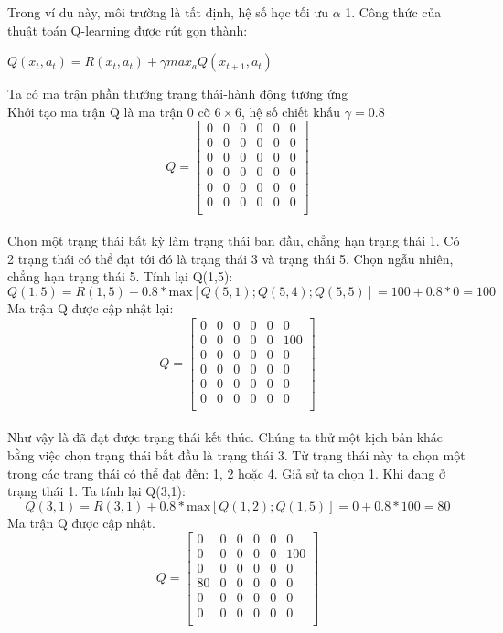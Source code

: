\documentclass[14pt,a4paper,oneside]{report}		%
\begin{document}
Trong ví dụ này, môi trường là tất định, hệ số học tối ưu $\alpha$ 1. Công thức của thuật toán Q-learning được rút gọn thành:
\begin{center}
$Q(x_t,a_t) = R(x_t,a_t)+\gamma max_aQ(x_{t+1},a_t)$\\
\end{center}
Ta có ma trận phần thưởng trạng thái-hành động tương ứng\\
Khởi tạo ma trận Q là ma trận 0 cỡ $6 \times 6$, hệ số chiết khấu $\gamma = 0.8$\\
$$Q=\begin{bmatrix}
0&0&0&0&0&0\\
0&0&0&0&0&0\\
0&0&0&0&0&0\\
0&0&0&0&0&0\\
0&0&0&0&0&0\\
0&0&0&0&0&0\\
\end{bmatrix}$$\\
Chọn một trạng thái bất kỳ làm trạng thái ban đầu, chẳng hạn  trạng thái 1. Có 2 trạng thái có thể đạt tới đó là trạng thái 3 và trạng thái 5. Chọn ngẫu nhiên, chẳng hạn trạng thái 5. Tính lại Q(1,5):
$$Q(1,5)=R(1,5)+0.8*\text{max}[{Q(5,1);Q(5,4);Q(5,5)}]=100+0.8*0=100$$
Ma trận Q được cập nhật lại:
$$Q=\begin{bmatrix}
0&0&0&0&0&0\\
0&0&0&0&0&100\\
0&0&0&0&0&0\\
0&0&0&0&0&0\\
0&0&0&0&0&0\\
0&0&0&0&0&0\\
\end{bmatrix}$$\\
Như vậy là đã đạt được trạng thái kết thúc. Chúng ta thử một  kịch bản khác bằng việc chọn trạng thái bắt đầu là trạng thái 3. Từ trạng thái này ta chọn một trong các trang thái có thể đạt đến: 1, 2 hoặc 4. Giả sử ta chọn 1. Khi đang ở trạng thái 1. Ta tính lại Q(3,1):
$$Q(3,1)=R(3,1)+0.8*\text{max}[{Q(1,2);Q(1,5)}]=0+0.8*100=80$$
Ma trận Q được cập nhật.
$$Q=\begin{bmatrix}
0&0&0&0&0&0\\
0&0&0&0&0&100\\
0&0&0&0&0&0\\
80&0&0&0&0&0\\
0&0&0&0&0&0\\
0&0&0&0&0&0\\
\end{bmatrix}$$\\
\end{document}
